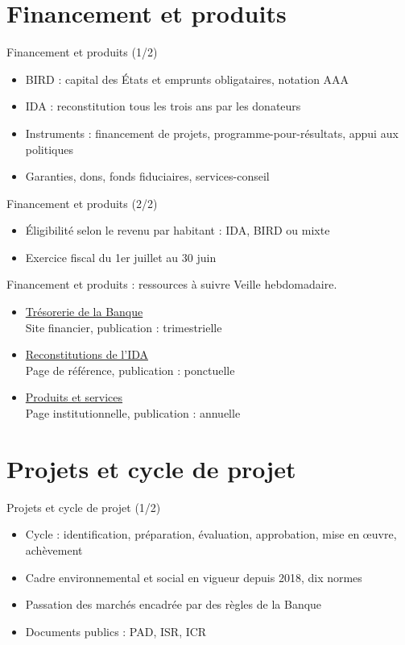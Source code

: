 \documentclass[aspectratio=169,11pt]{beamer}
\begin{document}
\section{Financement et produits}
\begin{frame}{Financement et produits (1/2)}
\begin{itemize}
\item BIRD : capital des États et emprunts obligataires, notation AAA
\item IDA : reconstitution tous les trois ans par les donateurs
\item Instruments : financement de projets, programme-pour-résultats, appui aux politiques
\item Garanties, dons, fonds fiduciaires, services-conseil
\end{itemize}
\end{frame}

\begin{frame}{Financement et produits (2/2)}
\begin{itemize}
\item Éligibilité selon le revenu par habitant : IDA, BIRD ou mixte
\item Exercice fiscal du 1er juillet au 30 juin
\end{itemize}
\end{frame}

\begin{frame}{Financement et produits : ressources à suivre}
\small
Veille hebdomadaire.
\begin{itemize}
\item \href{https://treasury.worldbank.org}{Trésorerie de la Banque}\\{\footnotesize Site financier, publication : trimestrielle}
\item \href{https://ida.worldbank.org/en/replenishments}{Reconstitutions de l'IDA}\\{\footnotesize Page de référence, publication : ponctuelle}
\item \href{https://www.worldbank.org/en/projects-operations/products-and-services}{Produits et services}\\{\footnotesize Page institutionnelle, publication : annuelle}
\end{itemize}
\end{frame}

\section{Projets et cycle de projet}
\begin{frame}{Projets et cycle de projet (1/2)}
\begin{itemize}
\item Cycle : identification, préparation, évaluation, approbation, mise en œuvre, achèvement
\item Cadre environnemental et social en vigueur depuis 2018, dix normes
\item Passation des marchés encadrée par des règles de la Banque
\item Documents publics : PAD, ISR, ICR
\end{itemize}
\end{frame}
\end{document}
